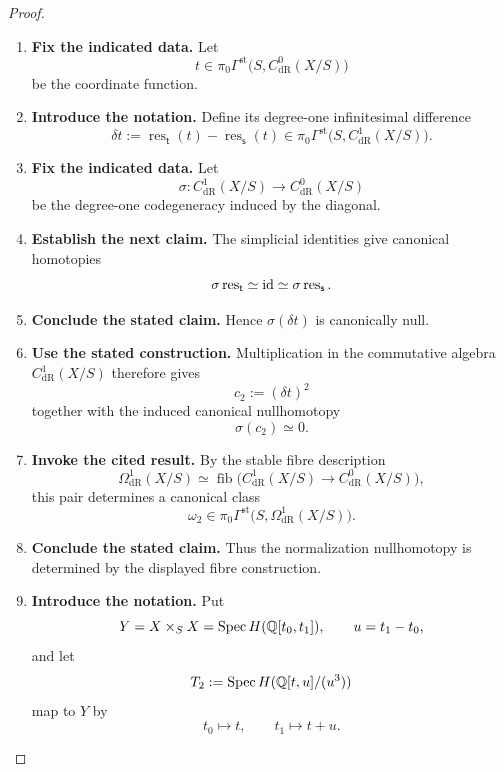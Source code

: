 \begin{proof}
\leavevmode
\begin{enumerate}[label=\textup{(\arabic*)}]
    \item \textbf{Fix the indicated data.}
    Let
    \[
    t\in
    \pi_0\Gamma^{\mathrm{st}}
    \bigl(S,C^0_{\mathrm{dR}}(X/S)\bigr)
    \]
    be the coordinate function.
    \item \textbf{Introduce the notation.}
    Define its degree-one infinitesimal difference
    \[
    \delta t
    :=
    \operatorname{res}_{\mathsf t}(t)
    -
    \operatorname{res}_{\mathsf s}(t)
    \in
    \pi_0\Gamma^{\mathrm{st}}
    \bigl(S,C^1_{\mathrm{dR}}(X/S)\bigr).
    \]
    \item \textbf{Fix the indicated data.}
    Let
    \[
    \sigma:
    C^1_{\mathrm{dR}}(X/S)\longrightarrow
    C^0_{\mathrm{dR}}(X/S)
    \]
    be the degree-one codegeneracy induced by the diagonal.
    \item \textbf{Establish the next claim.}
    The simplicial
    identities give canonical homotopies
    \[
    \sigma\operatorname{res}_{\mathsf t}\simeq\operatorname{id}
    \simeq
    \sigma\operatorname{res}_{\mathsf s}.
    \]
    \item \textbf{Conclude the stated claim.}
    Hence \(\sigma(\delta t)\) is canonically null.
    \item \textbf{Use the stated construction.}
    Multiplication in the
    commutative algebra \(C^1_{\mathrm{dR}}(X/S)\) therefore gives
    \[
    c_2:=(\delta t)^2
    \]
    together with the induced canonical nullhomotopy
    \[
    \sigma(c_2)\simeq0.
    \]
    \item \textbf{Invoke the cited result.}
    By the stable fibre description
    \[
    \Omega^1_{\mathrm{dR}}(X/S)
    \simeq
    \operatorname{fib}
    \bigl(
    C^1_{\mathrm{dR}}(X/S)\to C^0_{\mathrm{dR}}(X/S)
    \bigr),
    \]
    this pair determines a canonical class
    \[
    \omega_2
    \in
    \pi_0\Gamma^{\mathrm{st}}
    \bigl(S,\Omega^1_{\mathrm{dR}}(X/S)\bigr).
    \]
    \item \textbf{Conclude the stated claim.}
    Thus the normalization nullhomotopy is determined by the displayed fibre
    construction.
    \item \textbf{Introduce the notation.}
    Put
    \[
    Y=X\times_SX
    =
    \operatorname{Spec} H(\mathbb Q[t_0,t_1]),
    \qquad
    u=t_1-t_0,
    \]
    and let
    \[
    T_2
    :=
    \operatorname{Spec} H(\mathbb Q[t,u]/(u^3))
    \]
    map to \(Y\) by
    \[
    t_0\longmapsto t,
    \qquad
    t_1\longmapsto t+u.
\]
\end{enumerate}
\end{proof}

